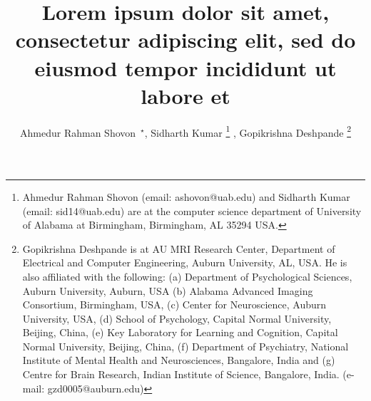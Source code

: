 \documentclass[11pt,letterpaper,english]{article}
\begin{document}
\title{Lorem ipsum dolor sit amet, consectetur adipiscing elit, sed do eiusmod tempor incididunt ut labore et}
\pagestyle{empty}

\author{Ahmedur Rahman Shovon~$^\star$, Sidharth Kumar \thanks{Ahmedur Rahman Shovon (email: ashovon@uab.edu) and Sidharth Kumar (email: sid14@uab.edu) are at the computer science department of University of Alabama at Birmingham, Birmingham, AL 35294 USA.}
, Gopikrishna Deshpande \thanks{Gopikrishna Deshpande is at AU MRI Research Center, Department of Electrical and Computer Engineering, Auburn University, AL, USA. He is also affiliated with the following: (a) Department of Psychological Sciences, Auburn University, Auburn, USA (b) Alabama Advanced Imaging Consortium, Birmingham, USA, (c) Center for Neuroscience, Auburn University, USA, (d) School of Psychology, Capital Normal University, Beijing, China, (e) Key Laboratory for Learning and Cognition, Capital Normal University, Beijing, China, (f) Department of Psychiatry, National Institute of Mental Health and Neurosciences, Bangalore, India and (g) Centre for Brain Research, Indian Institute of Science, Bangalore, India. (e-mail: gzd0005@auburn.edu)}
}







\date{}
\end{document}
